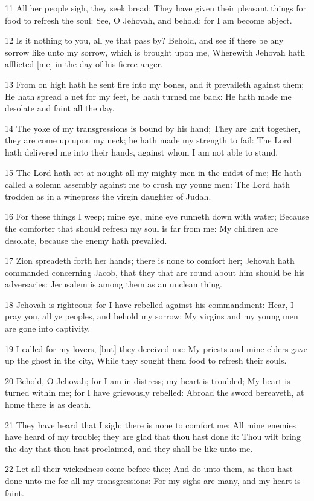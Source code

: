 \par 11 All her people sigh, they seek bread; They have given their pleasant things for food to refresh the soul: See, O Jehovah, and behold; for I am become abject.
\par 12 Is it nothing to you, all ye that pass by? Behold, and see if there be any sorrow like unto my sorrow, which is brought upon me, Wherewith Jehovah hath afflicted [me] in the day of his fierce anger.
\par 13 From on high hath he sent fire into my bones, and it prevaileth against them; He hath spread a net for my feet, he hath turned me back: He hath made me desolate and faint all the day.
\par 14 The yoke of my transgressions is bound by his hand; They are knit together, they are come up upon my neck; he hath made my strength to fail: The Lord hath delivered me into their hands, against whom I am not able to stand.
\par 15 The Lord hath set at nought all my mighty men in the midst of me; He hath called a solemn assembly against me to crush my young men: The Lord hath trodden as in a winepress the virgin daughter of Judah.
\par 16 For these things I weep; mine eye, mine eye runneth down with water; Because the comforter that should refresh my soul is far from me: My children are desolate, because the enemy hath prevailed.
\par 17 Zion spreadeth forth her hands; there is none to comfort her; Jehovah hath commanded concerning Jacob, that they that are round about him should be his adversaries: Jerusalem is among them as an unclean thing.
\par 18 Jehovah is righteous; for I have rebelled against his commandment: Hear, I pray you, all ye peoples, and behold my sorrow: My virgins and my young men are gone into captivity.
\par 19 I called for my lovers, [but] they deceived me: My priests and mine elders gave up the ghost in the city, While they sought them food to refresh their souls.
\par 20 Behold, O Jehovah; for I am in distress; my heart is troubled; My heart is turned within me; for I have grievously rebelled: Abroad the sword bereaveth, at home there is as death.
\par 21 They have heard that I sigh; there is none to comfort me; All mine enemies have heard of my trouble; they are glad that thou hast done it: Thou wilt bring the day that thou hast proclaimed, and they shall be like unto me.
\par 22 Let all their wickedness come before thee; And do unto them, as thou hast done unto me for all my transgressions: For my sighs are many, and my heart is faint.

